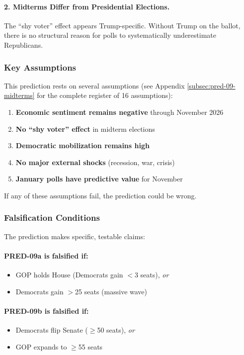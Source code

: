 \paragraph{2. Midterms Differ from Presidential Elections.}
The ``shy voter'' effect appears Trump-specific. Without Trump on the 
ballot, there is no structural reason for polls to systematically 
underestimate Republicans.

\subsubsection{Key Assumptions}

This prediction rests on several assumptions (see Appendix \ref{subsec:pred-09-midterms} 
for the complete register of 16 assumptions):

\begin{enumerate}
    \item \textbf{Economic sentiment remains negative} through November 2026
    \item \textbf{No ``shy voter'' effect} in midterm elections
    \item \textbf{Democratic mobilization remains high}
    \item \textbf{No major external shocks} (recession, war, crisis)
    \item \textbf{January polls have predictive value} for November
\end{enumerate}

If any of these assumptions fail, the prediction could be wrong.

\subsubsection{Falsification Conditions}

The prediction makes specific, testable claims:

\paragraph{PRED-09a is falsified if:}
\begin{itemize}
    \item GOP holds House (Democrats gain $<$3 seats), \emph{or}
    \item Democrats gain $>$25 seats (massive wave)
\end{itemize}

\paragraph{PRED-09b is falsified if:}
\begin{itemize}
    \item Democrats flip Senate ($\geq$50 seats), \emph{or}
    \item GOP expands to $\geq$55 seats
\end{itemize}

